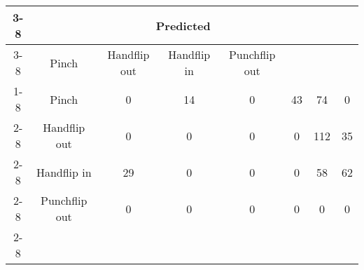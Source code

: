 \documentclass{standalone}
\begin{document}
 
 \begin{tabular}{|c |c |c |c |c |c |c |c |}
\cline{3-8}\multicolumn{2}{c|}{} & \multicolumn{6}{c|}{Predicted} \\ 
\cline{3-8} \multicolumn{2}{c |}{ } & Pinch & Handflip out & Handflip in & Punchflip out\\ 
\cline{1-8}\multirow{6}{*}{\rotatebox[origin=c]{90}{Actual}} & Pinch & 0 & 14 & 0 & 43 & 74 & 0\\ 
 \cline{2-8} & Handflip out & 0 & 0 & 0 & 0 & 112 & 35\\ 
 \cline{2-8} & Handflip in & 29 & 0 & 0 & 0 & 58 & 62\\ 
 \cline{2-8} & Punchflip out & 0 & 0 & 0 & 0 & 0 & 0\\ 
 \cline{2-8}\hline \end{tabular}
 
\end{document}

